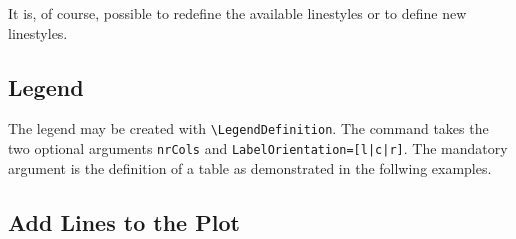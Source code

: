 It is, of course, possible to redefine the available linestyles or to define new
linestyles.

\begin{minipage}[T]{0.48\linewidth}
	
\end{minipage}
\begin{minipage}[T]{0.48\linewidth}
	
\end{minipage}




\subsection{Legend}

The legend may be created with \verb|\LegendDefinition|. The command takes the
two optional arguments \texttt{nrCols} and \texttt{LabelOrientation=[l|c|r]}.
The mandatory argument is the definition of a table as demonstrated in the
follwing examples.

\begin{minipage}[T]{0.5\linewidth}
	
\end{minipage}
\hspace{1ex}
\begin{minipage}[T]{0.4\linewidth}
	
\end{minipage}

\begin{minipage}[T]{0.5\linewidth}
	
\end{minipage}
\hspace{1ex}
\begin{minipage}[T]{0.4\linewidth}
	
\end{minipage}

\begin{minipage}[T]{0.5\linewidth}
	
\end{minipage}
\hspace{1ex}
\begin{minipage}[T]{0.4\linewidth}
	
\end{minipage}


\subsection{Add Lines to the Plot}

